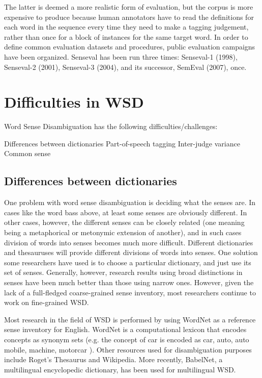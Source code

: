 \documentclass[11pt]{article}
\begin{document}
	The latter is deemed a more realistic form of evaluation, but the corpus is more expensive to produce because human annotators have to read the definitions for each word in the sequence every time they need to make a tagging judgement, rather than once for a block of instances for the same target word. In order to define common evaluation datasets and procedures, public evaluation campaigns have been organized. Senseval has been run three times: Senseval-1 (1998), Senseval-2 (2001), Senseval-3 (2004), and its successor, SemEval (2007), once.

	
\nocite{Lee:2002:EEK:1118693.1118699,NLE:138359,Yarowsky:1995:UWS:981658.981684}
\printbibliography
\endrefsection



\section{Difficulties in WSD}

Word Sense Disambiguation has the following difficulties/challenges:

	Differences between dictionaries
	Part-of-speech tagging
	Inter-judge variance
	Common sense


\subsection{Differences between dictionaries}

One problem with word sense disambiguation is deciding what the senses are. In cases like the word bass above, at least some senses are obviously different. In other cases, however, the different senses can be closely related (one meaning being a metaphorical or metonymic extension of another), and in such cases division of words into senses becomes much more difficult. Different dictionaries and thesauruses will provide different divisions of words into senses. One solution some researchers have used is to choose a particular dictionary, and just use its set of senses. Generally, however, research results using broad distinctions in senses have been much better than those using narrow ones. However, given the lack of a full-fledged coarse-grained sense inventory, most researchers continue to work on fine-grained WSD.

Most research in the field of WSD is performed by using WordNet as a reference sense inventory for English. WordNet is a computational lexicon that encodes concepts as synonym sets (e.g. the concept of car is encoded as { car, auto, auto mobile, machine, motorcar }). Other resources used for disambiguation purposes include Roget's Thesaurus and Wikipedia. More recently, BabelNet, a multilingual encyclopedic dictionary, has been used for multilingual WSD.
\end{document}
